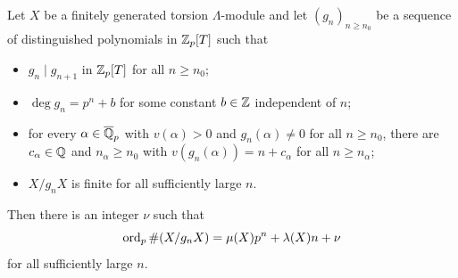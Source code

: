 \begin{prop}
\label{growth-general}
\leanok
Let $X$ be a finitely generated torsion $\Lambda$-module and let
$(g_n)_{n\geq n_0}$ be a sequence of distinguished polynomials in ${\mathbb {Z}}_p[T]$ such
that
\begin{itemize}
\item[(a)] $g_n\mid g_{n+1}$ in ${\mathbb {Z}}_p[T]$ for all $n\geq n_0$;
\item[(b)] $\deg g_n=p^n+b$ for some constant $b\in{\mathbb {Z}}$ independent of $n$;
\item[(c)] for every $\alpha\in\overline{{\mathbb {Q}}}_p$ with $v(\alpha)>0$ and
$g_n(\alpha)\neq 0$ for all $n\geq n_0$, there are $c_\alpha\in{\mathbb {Q}}$ and
$n_\alpha\geq n_0$ with $v(g_n(\alpha))=n+c_\alpha$ for all $n\geq n_\alpha$;
\item[(d)] $X/g_nX$ is finite for all sufficiently large $n$.
\end{itemize}
Then there is an integer $\nu$ such that
$$\operatorname{ord}_p\#(X/g_nX)=\mu(X)p^n+\lambda(X)n+\nu$$
for all sufficiently large $n$.
\end{prop}

